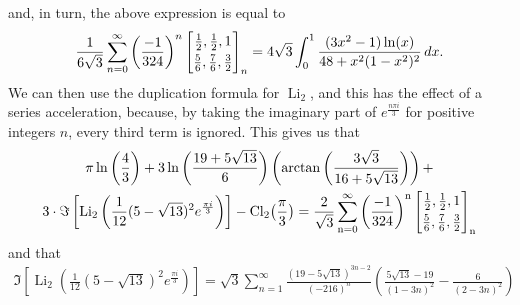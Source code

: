 \documentclass[12pt]{article}
\begin{document}
 and, in turn, the above expression is equal to $$ \frac{1}{6\sqrt{3}}\sum_{n=0}^{\infty} \left( \frac{-1}{324} \right)^{n} \left[ 
 \begin{matrix} \frac{1}{2}, \frac{1}{2}, 1 \vspace{1mm} \\ \frac{5}{6}, \frac{7}{6}, \frac{3}{2} \end{matrix} \right]_{n} =4 
 \sqrt{3} \int_{0}^{1} \frac{(3x^2 - 1)\ln(x)}{48 + x^2(1 - x^2)^2} \, dx. $$ We can then use the duplication formula for $\operatorname{Li}_{2}$, 
 and this has the effect of a series acceleration, because, by taking the imaginary part of $e^{\frac{n\pi i}{3}}$ for positive integers $n$, 
 every third term is ignored. This gives us that 
\begin{multline*}
 \pi \ln\left(\frac{4}{3}\right) + 3\ln\left(\frac{19 + 5\sqrt{13}}{6} \right)\left( \operatorname{arctan}\left(\frac{3\sqrt{3}}{16 + 
 5\sqrt{13}}\right)\right) + \\ 
 3\cdot\Im\left[\operatorname{Li}_2\left(\frac{1}{12}(5 - \sqrt{13})^2 e^{\frac{\pi i}{3}}\right)\right] - \rm{Cl}_2\big(\frac{\pi}3\big) = 
 \frac{2}{\sqrt{3}}\sum_{n=0}^{\infty} \left( \frac{-1}{324} \right)^{n} \left[ \begin{matrix} \frac{1}{2}, \frac{1}{2}, 1 \vspace{1mm} \\ 
 \frac{5}{6}, \frac{7}{6}, \frac{3}{2} \end{matrix} \right]_{n} 
\end{multline*}
 and that 
\begin{equation*}
\begin{aligned}
\Im\left[\operatorname{Li}_2\left(\frac{1}{12}(5 - \sqrt{13})^2 e^{\frac{\pi i}{3}}\right)\right] = 
 \sqrt{3}\sum_{n=1}^{\infty} \frac{(19 - 5 \sqrt{13})^{3n - 2} }{(-216)^n} \left( \frac{5 \sqrt{13} - 
 19}{(1 - 3n)^2} - \frac{6}{(2 - 3n)^2} \right)
\end{aligned}
\end{equation*}
\end{document}
